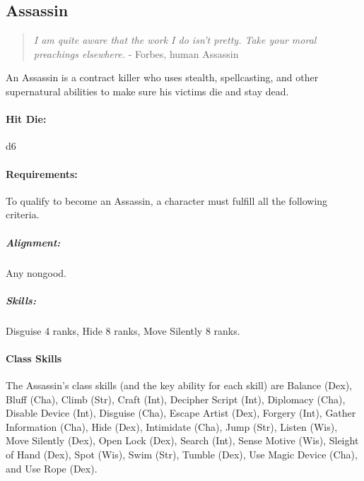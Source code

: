 \subsection{Assassin}
\begin{quote}
\emph{I am quite aware that the work I do isn't pretty. Take your moral preachings elsewhere.}
- Forbes, human Assassin
\end{quote}
An Assassin is a contract killer who uses stealth, spellcasting, and other supernatural abilities to make sure his victims die and stay dead.
\paragraph{Hit Die:} d6
\paragraph{Requirements:}
To qualify to become an Assassin, a character must fulfill all the following criteria.
\subparagraph{Alignment:} Any nongood.
\subparagraph{Skills:} Disguise 4 ranks, Hide 8 ranks, Move Silently 8 ranks.
\paragraph{Class Skills}
The Assassin's class skills (and the key ability for each skill) are Balance (Dex), Bluff (Cha), Climb (Str), Craft (Int), Decipher Script (Int), Diplomacy (Cha), Disable Device (Int), Disguise (Cha), Escape Artist (Dex), Forgery (Int), Gather Information (Cha), Hide (Dex), Intimidate (Cha), Jump (Str), Listen (Wis), Move Silently (Dex), Open Lock (Dex), Search (Int), Sense Motive (Wis), Sleight of Hand (Dex), Spot (Wis), Swim (Str), Tumble (Dex), Use Magic Device (Cha), and Use Rope (Dex).
